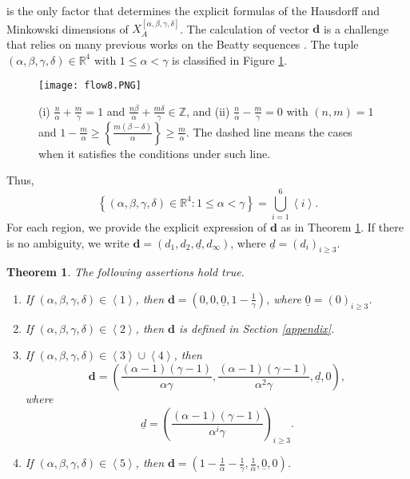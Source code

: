 \documentclass{amsart}
\newtheorem{theorem}{Theorem}[section]
\theoremstyle{definition}
\numberwithin{equation}{section}%
\begin{document}
is the only factor that determines the explicit formulas of the Hausdorff and Minkowski dimensions of $X_{A}^{\left[ \alpha ,\beta ,\gamma ,\delta\right]}$. The calculation of vector $\mathbf{d}$ is a challenge that relies on many previous works on the Beatty sequences \cite{graham1973covering, harman2015primes, harman2016primes,kuipers2012uniform}. The tuple $(\alpha ,\beta ,\gamma ,\delta )\in \mathbb{R}^{4}$ with $1\leq \alpha <\gamma $ is classified in Figure \ref{fig1}. \begin{figure}[]
\centering
\texttt{[image: flow8.PNG]}
\caption{(i) $\frac{n}{\alpha}+\frac{m}{\gamma}=1$ and $\frac{n\beta}{\alpha}+\frac{m\delta}{\gamma}\in \mathbb{Z}$, and (ii) $\frac{n}{\alpha}-\frac{m}{\gamma}=0$ with $(n,m)=1$ and $ 1-\frac{m}{\alpha}\geq \left\{\frac{m(\beta-\delta)}{\alpha}\right\}\geq \frac{m}{\alpha}$. The dashed line means the cases when it satisfies the conditions under such line.}
    \label{fig1}
\end{figure}
Thus,
\[
\left\{ (\alpha ,\beta ,\gamma ,\delta )\in \mathbb{R}^{4}:1\leq \alpha
<\gamma \right\} =\bigcup_{i=1}^{6}\left\langle i\right\rangle .
\]
For each region, we provide the explicit expression of $\mathbf{d}$ as in Theorem \ref{Thm: 2}. If there is no ambiguity, we write $\mathbf{d}=(d_{1},d_{2},\underline{d},d_{\infty })$, where $\underline{d}=\left(d_{i}\right)_{i\geq 3}$.

\begin{theorem}\label{Thm: 2}
The following assertions hold true.
\begin{enumerate}
\item If $(\alpha ,\beta ,\gamma ,\delta )\in \left\langle 1\right\rangle $, then $\mathbf{d}=(0,0,\underline{0},1-\frac{1}{\gamma })$, where $\underline{0}=(0)_{i\geq 3}$.

\item If $(\alpha ,\beta ,\gamma ,\delta )\in \left\langle 2\right\rangle $,
then $\mathbf{d}$ is defined in Section \ref{appendix}.

\item If $(\alpha ,\beta ,\gamma ,\delta )\in \left\langle 3\right\rangle
\cup \left\langle 4\right\rangle $, then 
\[
\mathbf{d}=\left( \frac{\left( \alpha -1\right) \left( \gamma -1\right) }{\alpha \gamma },\frac{\left( \alpha -1\right) \left( \gamma -1\right) }{\alpha ^{2}\gamma },\underline{d},0\right), 
\]
where 
\[
\underline{d}=\left( \frac{\left( \alpha -1\right) \left( \gamma -1\right) }{\alpha ^{i}\gamma }\right)_{i\geq 3}. 
\]

\item If $(\alpha ,\beta ,\gamma ,\delta )\in \left\langle 5\right\rangle $,
then $\mathbf{d}=(1-\frac{1}{\alpha }-\frac{1}{\gamma },\frac{1}{\alpha },\underline{0},0)$.
\end{enumerate}
\end{theorem}
\end{document}
